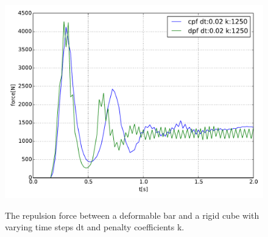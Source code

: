 \begin{figure}[tp]
\begin{minipage}[b]{0.5 \linewidth}
{				       \includegraphics[width=1.0\linewidth]{pics/pdf/cubeBM_t002.pdf} }
		\end{minipage}
		\begin{minipage}[b]{0.5 \linewidth}
			\centering
		\end{minipage}

  \caption{The repulsion force between a deformable bar and a rigid cube with varying time steps dt and penalty coefficients k.}
  \label{fig::defBar_vs_RigCubeBM}
\end{figure}
